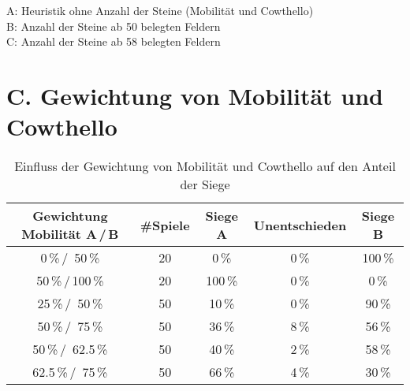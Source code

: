 \small{
A: Heuristik ohne Anzahl der Steine (Mobilität und Cowthello) \\
B: Anzahl der Steine ab 50 belegten Feldern \\
C: Anzahl der Steine ab 58 belegten Feldern}

\pagebreak

\section*{C. Gewichtung von Mobilität und Cowthello}
 
\setcounter{table}{0}
\renewcommand{\thetable}{C\arabic{table}}

\begin{table}[hb]
\centering
\begin{tabular}{c|c|ccc}
\hline
Gewichtung Mobilität A\,/\,B & \#Spiele & Siege A & Unentschieden & Siege B \\
\hline
   0\,\%\,/\, 50\,\% & 20 &  0\,\% &  0\,\% &100\,\% \\
  50\,\%\,/\,100\,\% & 20 &100\,\% &  0\,\% &  0\,\% \\
  25\,\%\,/\, 50\,\% & 50 & 10\,\% &  0\,\% & 90\,\% \\
  50\,\%\,/\, 75\,\% & 50 & 36\,\% &  8\,\% & 56\,\% \\
  50\,\%\,/\, 62.5\,\% & 50 & 40\,\% &  2\,\% & 58\,\% \\
  62.5\,\%\,/\, 75\,\% & 50 & 66\,\% &  4\,\% & 30\,\% \\
\hline
\end{tabular}
\caption{Einfluss der Gewichtung von Mobilität und Cowthello auf den Anteil der Siege}
\label{table:combinedweighting}
\end{table}

\pagebreak

